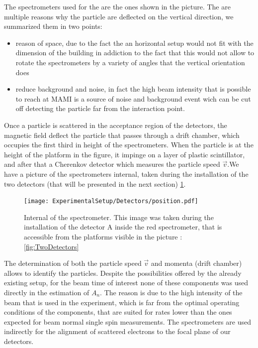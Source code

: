 The spectrometers used for the \transv are the ones shown in the picture. The are multiple reasons why the particle are deflected on the vertical direction, we summarized them in two points: 
\begin{itemize}
\item reason of space, due to the fact the an horizontal setup would not fit with the dimension of the building in addiction to the fact that this would not allow to rotate the spectrometers by a variety of angles that the vertical orientation does
\item reduce background and noise, in fact the high beam intensity that is possible to reach at MAMI is a source of noise and background event wich can be cut off detecting the particle far from the interaction point. 
\end{itemize}      

Once a particle is scattered in the acceptance region of the detectors, the magnetic field deflect the particle that passes through a drift chamber, which occupies the first third in height of the spectrometers. When the particle is at the height of the platform in the figure, 
it impinge on a layer of plastic scintillator, and after that a Cherenkov detector which measures the particle speed $\vec{v}$.We have a picture of the spectrometers internal, taken during the installation of the two detectors (that will be presented in the next section) \ref{fig:internal}.

\begin{figure}
\centering
\texttt{[image: ExperimentalSetup/Detectors/position.pdf]}
\caption{Internal of the spectrometer. This image was taken during the installation of the detector A inside the red spectrometer, that is accessible from the platforms visible in the picture : \ref{fig:TwoDetectors}}
\vspace{-200pt}
\label{fig:internal}
\end{figure}

The determination of both the particle speed $\vec{v}$ and momenta (drift chamber) allows to identify the particles. Despite the possibilities offered by the already existing setup, for the beam time of interest none of these components was used directly in the estimation of $A_{n}$. The reason is due to the high intensity of the beam that is used in the experiment, which is far from the optimal operating conditions of the components, that are suited for rates lower than the ones expected for beam normal single spin measurements. The spectrometers are used indirectly for the alignment of scattered electrons to the focal plane of our detectors.

